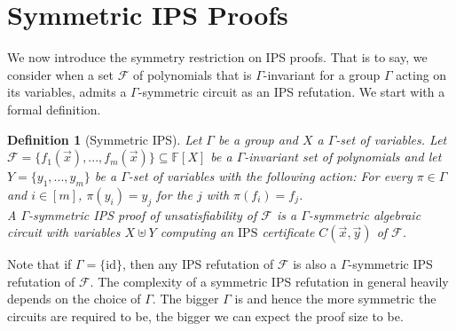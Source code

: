 \documentclass[10pt,a4paper]{article}
\newtheorem{lemma}[theorem]{Lemma}
\newtheorem{definition}[theorem]{Definition}
\newcommand{\IPS}{\mathrm{IPS}}
\newcommand{\poly}{\text{\upshape poly}}
\newcommand{\id}{\ensuremath{\mathrm{id}}}
\newcommand{\Field}{\ensuremath{\mathbb{F}}}
\newcommand{\F}{\ensuremath{\mathcal{F}}}
\begin{document}
	

\section{Symmetric IPS Proofs}
\label{sec:symIPS}
We now introduce the symmetry restriction on IPS proofs.  That is to say, we consider when a set $\F$ of polynomials that is $\Gamma$-invariant for a group $\Gamma$ acting on its variables, admits a $\Gamma$-symmetric circuit as an IPS refutation.  We start with a formal definition.

\begin{definition}[Symmetric IPS]
	Let $\Gamma$ be a group and $X$ a $\Gamma$-set of variables. Let $\F = \{ f_1(\vec x), ..., f_m(\vec x)\}  \subseteq \Field[X]$ be a $\Gamma$-invariant set of polynomials and let $Y = \{y_1,...,y_m\}$ be a $\Gamma$-set of variables with the following action: For every $\pi \in \Gamma$ and $ i \in [m]$, $\pi(y_i) = y_j$ for the $j$ with $\pi(f_i) = f_j$.\\
	A \emph{$\Gamma$-symmetric IPS proof} of unsatisfiability of $\F$ is a $\Gamma$-symmetric algebraic circuit with variables $X \uplus Y$
	computing an $\IPS$ certificate $C(\vec x, \vec y)$ of $\F$.
\end{definition}
Note that if $\Gamma = \{\id\}$, then any IPS refutation of $\F$ is also a $\Gamma$-symmetric IPS refutation of $\F$. The complexity of a symmetric IPS refutation in general heavily depends on the choice of $\Gamma$. The bigger $\Gamma$ is and hence the more symmetric the circuits are required to be, the bigger we can expect the proof size to be.
\end{document}
